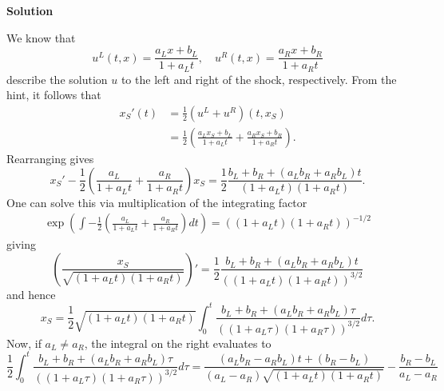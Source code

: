 \documentclass{article}
\begin{document}
\begin{itemize}
\textbf{Solution}

We know that
\begin{equation*}
u^L(t,x) = \frac{a_L x + b_L}{1 + a_L t}, \quad u^R(t,x) = \frac{a_R x + b_R}{1 + a_R t}
\end{equation*}
describe the solution $u$ to the left and right of the shock, respectively. From the hint, it follows that
\begin{align*}
x_S'(t) & = \frac{1}{2} \left( u^L + u^R \right) \left( t, x_S \right) \\
        & = \frac{1}{2} \left( \frac{a_L x_S + b_L}{1 + a_L t} + \frac{a_R x_S + b_R}{1 + a_R t} \right).
\end{align*}
Rearranging gives
\begin{equation*}
x_S' - \frac{1}{2} \left( \frac{a_L}{1 + a_L t} + \frac{a_R}{1 + a_R t} \right) x_S = \frac{1}{2} \frac{b_L + b_R + \left( a_L b_R + a_R b_L \right) t}{\left( 1 + a_L t \right) \left( 1 + a_R t \right)}.
\end{equation*}
One can solve this via multiplication of the integrating factor
\begin{align*}
\exp \left( \int -\frac{1}{2} \left( \frac{a_L}{1 + a_L t} + \frac{a_R}{1 + a_R t} \right) dt \right) = \left( \left( 1 + a_L t \right) \left( 1 + a_R t \right) \right)^{-1/2}
\end{align*}
giving
\begin{equation*}
\left( \frac{x_S}{\sqrt{\left( 1 + a_L t \right) \left( 1 + a_R t \right)}} \right)' = \frac{1}{2} \frac{b_L + b_R + \left( a_L b_R + a_R b_L \right) t}{\left( \left( 1 + a_L t \right) \left( 1 + a_R t \right) \right)^{3/2}}
\end{equation*}
and hence
\begin{equation*}
x_S = \frac{1}{2} \sqrt{\left( 1 + a_L t \right) \left( 1 + a_R t \right)} \int_0^t \frac{b_L + b_R + \left( a_L b_R + a_R b_L \right) \tau}{\left( \left( 1 + a_L \tau \right) \left( 1 + a_R \tau \right) \right)^{3/2}} d\tau.
\end{equation*}
Now, if $a_L \neq a_R$, the integral on the right evaluates to
\begin{equation*}
\frac{1}{2} \int_0^t \frac{b_L + b_R + \left( a_L b_R + a_R b_L \right) \tau}{\left( \left( 1 + a_L \tau \right) \left( 1 + a_R \tau \right) \right)^{3/2}} d\tau = \frac{\left( a_L b_R - a_R b_L \right) t + \left( b_R - b_L \right)}{\left( a_L - a_R \right) \sqrt{\left( 1 + a_L t \right) \left( 1 + a_R t \right)}} - \frac{b_R - b_L}{a_L - a_R}
\end{equation*}

\end{itemize}
\end{document}
